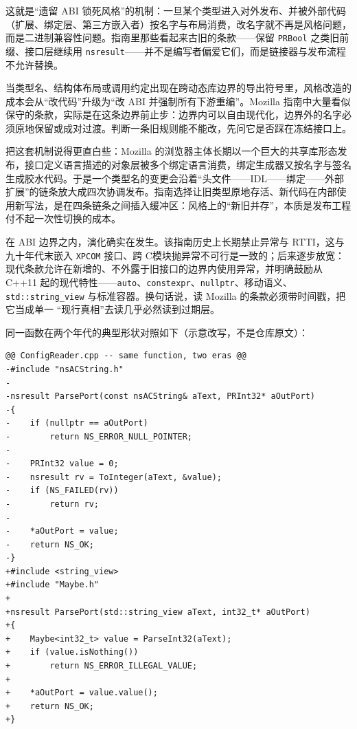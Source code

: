 \documentclass[12pt,a4paper,fontset=fandol]{ctexbook}
\newcommand{\cpp}[1]{C++#1}
\newcommand{\Tp}[1]{\texttt{#1}}
\newcommand{\Lang}[1]{\textsf{#1}}
\newcommand{\CL}{\Lang{C}}
\begin{document}
这就是``遗留 ABI 锁死风格''的机制：一旦某个类型进入对外发布、并被外部代码（扩展、绑定层、第三方嵌入者）按名字与布局消费，改名字就不再是风格问题，而是二进制兼容性问题。指南里那些看起来古旧的条款——保留 \Tp{PRBool} 之类旧前缀、接口层继续用 \Tp{nsresult}——并不是编写者偏爱它们，而是链接器与发布流程不允许替换。

\begin{guideline}[title={遗留 ABI 如何锁死风格}]
当类型名、结构体布局或调用约定出现在跨动态库边界的导出符号里，风格改造的成本会从``改代码''升级为``改 ABI 并强制所有下游重编''。Mozilla 指南中大量看似保守的条款，实际是在这条边界前止步：边界内可以自由现代化，边界外的名字必须原地保留或成对过渡。判断一条旧规则能不能改，先问它是否踩在冻结接口上。
\end{guideline}

把这套机制说得更直白些：Mozilla 的浏览器主体长期以一个巨大的共享库形态发布，接口定义语言描述的对象层被多个绑定语言消费，绑定生成器又按名字与签名生成胶水代码。于是一个类型名的变更会沿着``头文件——IDL——绑定——外部扩展''的链条放大成四次协调发布。指南选择让旧类型原地存活、新代码在内部使用新写法，是在四条链条之间插入缓冲区：风格上的``新旧并存''，本质是发布工程付不起一次性切换的成本。

在 ABI 边界之内，演化确实在发生。该指南历史上长期禁止异常与 RTTI，这与九十年代末嵌入 \Tp{XPCOM} 接口、跨 \CL 模块抛异常不可行是一致的；后来逐步放宽：现代条款允许在新增的、不外露于旧接口的边界内使用异常，并明确鼓励从 \cpp{11} 起的现代特性——\Tp{auto}、\Tp{constexpr}、\Tp{nullptr}、移动语义、\Tp{std::string\_view} 与标准容器。换句话说，读 Mozilla 的条款必须带时间戳，把它当成单一 ``现行真相''去读几乎必然读到过期层。

同一函数在两个年代的典型形状对照如下（示意改写，不是仓库原文）：

\begin{lstlisting}[style=diffstyle,caption={同一个解析函数在 ``返回码时代''与现代条款下的两种形状（示意对照）},label={lst:ch04-nspr-evolution}]
@@ ConfigReader.cpp -- same function, two eras @@
-#include "nsACString.h"
-
-nsresult ParsePort(const nsACString& aText, PRInt32* aOutPort)
-{
-    if (nullptr == aOutPort)
-        return NS_ERROR_NULL_POINTER;
-
-    PRInt32 value = 0;
-    nsresult rv = ToInteger(aText, &value);
-    if (NS_FAILED(rv))
-        return rv;
-
-    *aOutPort = value;
-    return NS_OK;
-}
+#include <string_view>
+#include "Maybe.h"
+
+nsresult ParsePort(std::string_view aText, int32_t* aOutPort)
+{
+    Maybe<int32_t> value = ParseInt32(aText);
+    if (value.isNothing())
+        return NS_ERROR_ILLEGAL_VALUE;
+
+    *aOutPort = value.value();
+    return NS_OK;
+}
\end{lstlisting}
\end{document}
